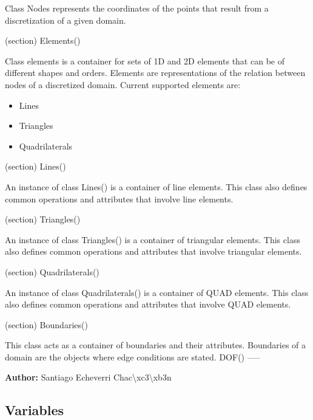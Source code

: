     Class Nodes represents the coordinates of the points that result from a
    discretization of a given domain.

  (section) Elements()

    Class elements is a container for sets of 1D and 2D elements that can 
    be of different shapes and orders. Elements are representations of the 
    relation between nodes of a discretized domain. Current supported 
    elements are:

    \begin{itemize}
    \setlength{\parskip}{0.6ex}
      \item Lines

      \item Triangles

      \item Quadrilaterals

    \end{itemize}

  (section) Lines()

    An instance of class Lines() is a container of line elements. This 
    class also defines common operations and attributes that involve line 
    elements.

  (section) Triangles()

    An instance of class Triangles() is a container of triangular elements.
    This class also defines common operations and attributes that involve 
    triangular elements.

  (section) Quadrilaterals()

    An instance of class Quadrilaterals() is a container of QUAD elements. 
    This class also defines common operations and attributes that involve 
    QUAD elements.

  (section) Boundaries()

    This class acts as a container of boundaries and their attributes. 
    Boundaries of a domain are the objects where edge conditions are 
    stated. DOF() -----

\textbf{Author:} Santiago Echeverri Chac{\textbackslash}xc3{\textbackslash}xb3n





  \subsection{Variables}

